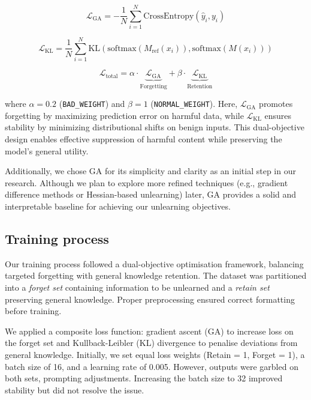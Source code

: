 \documentclass[11pt]{article}
\begin{document}
\begin{equation}
    \mathcal{L}_{\text{GA}} = -\frac{1}{N} \sum_{i=1}^{N} \text{CrossEntropy}(\hat{y}_i, y_i)
\end{equation}

\begin{equation}
    \mathcal{L}_{\text{KL}} = \frac{1}{N} \sum_{i=1}^{N} \text{KL}(\text{softmax}(M_{\text{ref}}(x_i)), \text{softmax}(M(x_i)))
\end{equation}

\begin{equation}
    \mathcal{L}_{\text{total}} = \alpha \cdot \underbrace{\mathcal{L}_{\text{GA}}}_{\text{Forgetting}} + \beta \cdot \underbrace{\mathcal{L}_{\text{KL}}}_{\text{Retention}}
\end{equation}

where $\alpha = 0.2$ (\texttt{BAD\_WEIGHT}) and $\beta = 1$ (\texttt{NORMAL\_WEIGHT}). Here, $\mathcal{L}_{\text{GA}}$ promotes forgetting by maximizing prediction error on harmful data, while $\mathcal{L}_{\text{KL}}$ ensures stability by minimizing distributional shifts on benign inputs. This dual-objective design enables effective suppression of harmful content while preserving the model’s general utility.

Additionally, we chose GA for its simplicity and clarity as an initial step in our research. Although we plan to explore more refined techniques (e.g., gradient difference methods or Hessian-based unlearning) later, GA provides a solid and interpretable baseline for achieving our unlearning objectives.

\subsection*{Training process}

Our training process followed a dual-objective optimisation framework, balancing targeted forgetting with general knowledge retention. The dataset was partitioned into a \textit{forget set} containing information to be unlearned and a \textit{retain set} preserving general knowledge. Proper preprocessing ensured correct formatting before training.

We applied a composite loss function: gradient ascent (GA) to increase loss on the forget set and Kullback-Leibler (KL) divergence to penalise deviations from general knowledge. Initially, we set equal loss weights (Retain = 1, Forget = 1), a batch size of 16, and a learning rate of 0.005. However, outputs were garbled on both sets, prompting adjustments. Increasing the batch size to 32 improved stability but did not resolve the issue.
\end{document}
